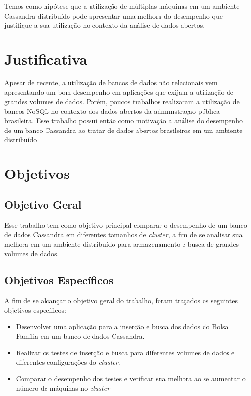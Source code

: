 Temos como hipótese que a utilização de múltiplas máquinas em um ambiente Cassandra distribuído pode apresentar uma melhora do desempenho que justifique a sua utilização no contexto da análise de dados abertos.

\section{Justificativa}
Apesar de recente, a utilização de bancos de dados não relacionais vem apresentando um bom desempenho em aplicações que exijam a utilização de grandes volumes de dados. Porém, poucos trabalhos realizaram a utilização de bancos NoSQL no contexto dos dados abertos da administração pública brasileira. Esse trabalho possui então como motivação a análise do desempenho de um banco Cassandra ao tratar de dados abertos brasileiros em um ambiente distribuído

\section{Objetivos}

\subsection{Objetivo Geral}
Esse trabalho tem como objetivo principal comparar o desempenho de um banco de dados Cassandra em diferentes tamanhos de \emph{cluster}, a fim de se analisar sua melhora em um ambiente distribuído para armazenamento e busca de grandes volumes de dados.

\subsection{Objetivos Específicos}
A fim de se alcançar o objetivo geral do trabalho, foram traçados os seguintes objetivos específicos:
\begin{itemize}
	\item Desenvolver uma aplicação para a inserção e busca dos dados do Bolsa Família em um banco de dados Cassandra.
	
	\item Realizar os testes de inserção e busca para diferentes volumes de dados e diferentes configurações do \emph{cluster}.
	
	\item Comparar o desempenho dos testes e verificar sua melhora ao se aumentar o número de máquinas no \emph{cluster}
\end{itemize}

